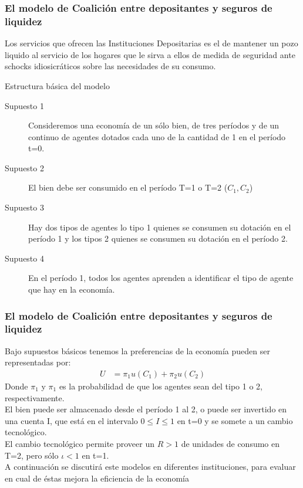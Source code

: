\documentclass[10pt, xcolor=table, x11names]{beamer}
\begin{document}
\begin{frame}
    \frametitle{{\normalsize El modelo de Coalición entre depositantes y seguros de liquidez } {}}
    
    Los servicios que ofrecen las Instituciones Depositarias es el de mantener un pozo liquido al servicio de los hogares que le sirva a ellos de medida de seguridad ante schocks idiosicráticos sobre las necesidades de su consumo.
    
     \begin{block} {Estructura básica del modelo}
        \begin{description}
            \item[Supuesto 1] Consideremos una economía de un sólo bien,  de tres períodos y de un continuo de agentes dotados cada uno de la cantidad de 1 en el período t=0.
            \item[Supuesto 2] El bien debe ser consumido en el período T=1 o T=2 ($C_{1}, C_{2} $)
            \item[Supuesto 3] Hay dos tipos de agentes lo tipo 1 quienes se consumen su dotación en el período 1 y los tipos 2 quienes se consumen su dotación en el período 2.
             \item[Supuesto 4] En el período 1, todos los agentes aprenden a identificar el tipo de agente que hay en la economía.
         \end{description}
        
    \end{block}	
    
    
    
\end{frame}

\begin{frame}
    \frametitle{{\normalsize El modelo de Coalición entre depositantes y seguros de liquidez } {}}
    
   Bajo supuestos básicos tenemos la preferencias de la economía pueden ser representadas por:
   \begin{align}
   U&=\pi_{1}u(C_{1})+\pi_{2}u(C_{2})\nonumber
   \end{align}
   Donde $\pi_{1}$ y  $\pi_{1}$ es la probabilidad de que los agentes sean del tipo 1 o 2, respectivamente.\\
   El bien puede ser almacenado desde el período 1 al 2, o puede ser invertido en una cuenta I, que está en el intervalo $0\leq I \leq 1$ en t=0 y se somete a un cambio tecnológico.\\ 
   El cambio tecnológico permite proveer un $R>1$ de unidades de consumo en T=2, pero sólo  $\iota<1$ en t=1.\\
   
   A continuación se discutirá este modelos en diferentes instituciones, para evaluar en cual de éstas mejora la eficiencia de la economía
   
\end{frame}
\end{document}
